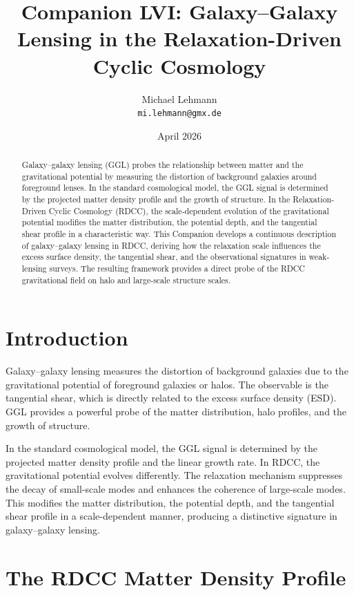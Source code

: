 \documentclass[11pt,a4paper]{article}
\title{\textbf{Companion LVI: Galaxy--Galaxy Lensing in the Relaxation-Driven Cyclic Cosmology}}
\author{Michael Lehmann \\ \texttt{mi.lehmann@gmx.de}}
\date{April 2026}
\begin{document}
\maketitle

\begin{abstract}
Galaxy--galaxy lensing (GGL) probes the relationship between matter and the 
gravitational potential by measuring the distortion of background galaxies around 
foreground lenses. In the standard cosmological model, the GGL signal is determined 
by the projected matter density profile and the growth of structure. In the 
Relaxation-Driven Cyclic Cosmology (RDCC), the scale-dependent evolution of the 
gravitational potential modifies the matter distribution, the potential depth, and 
the tangential shear profile in a characteristic way. This Companion develops a 
continuous description of galaxy--galaxy lensing in RDCC, deriving how the 
relaxation scale influences the excess surface density, the tangential shear, and 
the observational signatures in weak-lensing surveys. The resulting framework 
provides a direct probe of the RDCC gravitational field on halo and large-scale 
structure scales.
\end{abstract}
\section{Introduction}

Galaxy--galaxy lensing measures the distortion of background galaxies due to the 
gravitational potential of foreground galaxies or halos. The observable is the 
tangential shear, which is directly related to the excess surface density (ESD). 
GGL provides a powerful probe of the matter distribution, halo profiles, and the 
growth of structure.

In the standard cosmological model, the GGL signal is determined by the projected 
matter density profile and the linear growth rate. In RDCC, the gravitational 
potential evolves differently. The relaxation mechanism suppresses the decay of 
small-scale modes and enhances the coherence of large-scale modes. This modifies 
the matter distribution, the potential depth, and the tangential shear profile in a 
scale-dependent manner, producing a distinctive signature in galaxy--galaxy 
lensing.
\section{The RDCC Matter Density Profile}
\end{document}
